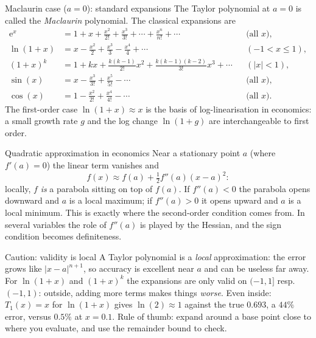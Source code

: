 \begin{rulebox}{Maclaurin case ($a=0$): standard expansions}
The Taylor polynomial at $a=0$ is called the \emph{Maclaurin}
polynomial. The classical expansions are
\[
\begin{aligned}
  \mathrm{e}^{x}&=1+x+\frac{x^{2}}{2!}+\frac{x^{3}}{3!}+\cdots
                  +\frac{x^{n}}{n!}+\cdots
                  &&\text{(all }x\text{)},\\
  \ln(1+x)&=x-\frac{x^{2}}{2}+\frac{x^{3}}{3}-\frac{x^{4}}{4}+\cdots
                  &&(-1<x\leq 1),\\
  (1+x)^{k}&=1+kx+\frac{k(k-1)}{2!}x^{2}
                  +\frac{k(k-1)(k-2)}{3!}x^{3}+\cdots
                  &&(|x|<1),\\
  \sin(x)&=x-\frac{x^{3}}{3!}+\frac{x^{5}}{5!}-\cdots
                  &&\text{(all }x\text{)},\\
  \cos(x)&=1-\frac{x^{2}}{2!}+\frac{x^{4}}{4!}-\cdots
                  &&\text{(all }x\text{)}.
\end{aligned}
\]
The first-order case $\ln(1+x)\approx x$ is the basis of
log-linearisation in economics: a small growth rate $g$ and the log
change $\ln(1+g)$ are interchangeable to first order.
\end{rulebox}

\begin{rulebox}{Quadratic approximation in economics}
Near a stationary point $a$ (where $f'(a)=0$) the linear term vanishes
and
\[
  f(x)\approx f(a)+\tfrac12 f''(a)(x-a)^{2}:
\]
locally, $f$ \emph{is} a parabola sitting on top of $f(a)$. If
$f''(a)<0$ the parabola opens downward and $a$ is a local maximum; if
$f''(a)>0$ it opens upward and $a$ is a local minimum. This is exactly
where the second-order condition comes from. In several variables the
role of $f''(a)$ is played by the Hessian, and the sign condition
becomes definiteness.
\end{rulebox}

\begin{rulebox}{Caution: validity is local}
A Taylor polynomial is a \emph{local} approximation: the error grows
like $|x-a|^{n+1}$, so accuracy is excellent near $a$ and can be
useless far away. For $\ln(1+x)$ and $(1+x)^{k}$ the expansions are
only valid on $(-1,1]$ resp.\ $(-1,1)$: outside, adding more terms
makes things \emph{worse}. Even inside: $T_{1}(x)=x$ for $\ln(1+x)$
gives $\ln(2)\approx 1$ against the true $0.693$, a $44\%$ error,
versus $0.5\%$ at $x=0.1$. Rule of thumb: expand around a base point
close to where you evaluate, and use the remainder bound to check.
\end{rulebox}

